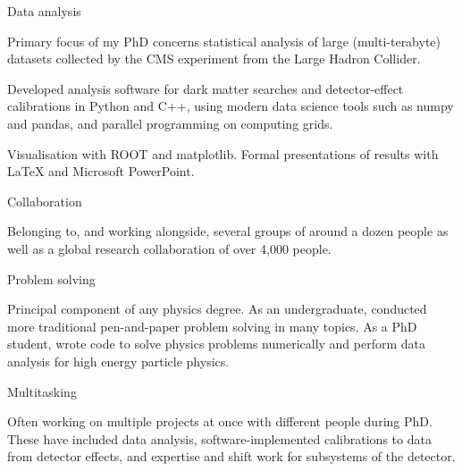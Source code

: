 
\newcommand{\vpaddingskills}{\vspace{1mm}}

\begin{cventries}

    \cventry
    {} %
    {Data analysis} %
    {} %
    {} %
    {
      \begin{cvitems}
        \item {Primary focus of my PhD concerns statistical analysis of large (multi-terabyte) datasets collected by the CMS experiment from the Large Hadron Collider.}
        \item {Developed analysis software for dark matter searches and detector-effect calibrations in Python and C++, using modern data science tools such as numpy and pandas, and parallel programming on computing grids.}
        \item{Visualisation with ROOT and matplotlib. Formal presentations of results with LaTeX and Microsoft PowerPoint.}
        \vpaddingskills
        \end{cvitems}
    }

    \cventry
    {}
    {Collaboration}
    {}
    {}
    {
      \begin{cvitems}
        \item {Belonging to, and working alongside, several groups of around a dozen people as well as a global research collaboration of over 4,000 people.}
        \vpaddingskills
        \end{cvitems}
    }

    \cventry
    {}
    {Problem solving}
    {}
    {}
    {
      \begin{cvitems}
        \item {Principal component of any physics degree. As an undergraduate, conducted more traditional pen-and-paper problem solving in many topics. As a PhD student, wrote code to solve physics problems numerically and perform data analysis for high energy particle physics.}
        \vpaddingskills
        \end{cvitems}
    }

    \cventry
    {}
    {Multitasking}
    {}
    {}
    {
      \begin{cvitems}
        \item {Often working on multiple projects at once with different people during PhD. These have included data analysis, software-implemented calibrations to data from detector effects, and expertise and shift work for subsystems of the detector.}
        \vpaddingskills
        \end{cvitems}
    }


\end{cventries}
